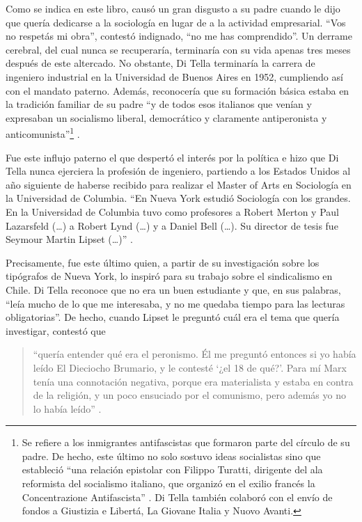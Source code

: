 Como se indica en este libro, \textcite[164]{1652-DITELLA1993} causó un gran disgusto a su padre cuando le dijo que quería dedicarse a la sociología en lugar de a la actividad empresarial. \enquote{Vos no respetás mi obra}, contestó indignado, \enquote{no me has comprendido}. Un derrame cerebral, del cual nunca se recuperaría, terminaría con su vida apenas tres meses después de este altercado. No obstante, Di Tella terminaría la carrera de ingeniero industrial en la Universidad de Buenos Aires en 1952, cumpliendo así con el mandato paterno. Además, reconocería que su formación básica estaba en la tradición familiar de su padre \enquote{y de todos esos italianos que venían y expresaban un socialismo liberal, democrático y claramente antiperonista y anticomunista}\footnote{Se refiere a los inmigrantes antifascistas que formaron parte del círculo de su padre. De hecho, este último no solo sostuvo ideas socialistas sino que estableció \enquote{una relación epistolar con Filippo Turatti, dirigente del ala reformista del socialismo italiano, que organizó en el exilio francés la Concentrazione Antifascista} \parencite[55]{1652-DITELLA1993}. Di Tella también colaboró con el envío de fondos a Giustizia e Libertá, La Giovane Italia y Nuovo Avanti.} \parencite[270]{1553-CAMOU2009}.

Fue este influjo paterno el que despertó el interés por la política e hizo que Di Tella nunca ejerciera la profesión de ingeniero, partiendo a los Estados Unidos al año siguiente de haberse recibido para realizar el Master of Arts en Sociología en la Universidad de Columbia. \enquote{En Nueva York  estudió Sociología con los grandes. En la Universidad de Columbia tuvo como profesores a Robert Merton y Paul Lazarsfeld (\dots) a Robert Lynd (\dots) y a Daniel Bell (\dots). Su director de tesis fue Seymour Martin Lipset (\dots)} \parencite[30]{1648-DITELLA2019}.

Precisamente, fue este último quien, a partir de su investigación sobre los tipógrafos de Nueva York, lo inspiró para su trabajo sobre el sindicalismo en Chile. Di Tella reconoce que no era un buen estudiante y que, en sus palabras, \enquote{leía mucho de lo que me interesaba, y no me quedaba tiempo para las lecturas obligatorias}. De hecho, cuando Lipset le preguntó cuál era el tema que quería investigar, contestó que

\begin{quote}
\enquote{quería entender qué era el peronismo. Él me preguntó entonces si yo había leído El Dieciocho Brumario, y le contesté \enquote{¿el 18 de qué?}. Para mí Marx tenía una connotación negativa, porque era materialista y estaba en contra de la religión, y un poco ensuciado por el comunismo, pero además yo no lo había leído} \parencite[267]{1553-CAMOU2009}.
\end{quote}

